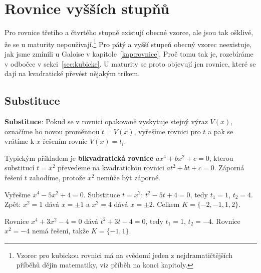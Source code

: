 \section{Rovnice vyšších stupňů}\label{sec:vyssi-stupne}

Pro rovnice třetího a čtvrtého stupně existují obecné vzorce, ale jsou tak ošklivé, že se u maturity nepoužívají.\footnote{Vzorec pro kubickou rovnici má na svědomí jeden z nejdramatičtějších příběhů dějin matematiky, viz příběh na konci kapitoly.} Pro pátý a vyšší stupeň obecný vzorec neexistuje, jak jsme zmínili u Galoise v kapitole~\ref{kap:rovnice}. Proč tomu tak je, rozebíráme v odbočce v sekci~\ref{sec:kubicke}. U maturity se proto objevují jen rovnice, které se dají na kvadratické převést nějakým trikem.

\subsection{Substituce}

\begin{definitionbox}
  \textbf{Substituce}: Pokud se v rovnici opakovaně vyskytuje stejný výraz $V(x)$, označíme ho novou proměnnou $t = V(x)$, vyřešíme rovnici pro $t$ a pak se vrátíme k $x$ řešením rovnic $V(x) = t_i$.

  \vspace{0.2cm}

  Typickým příkladem je \textbf{bikvadratická rovnice} $ax^4 + bx^2 + c = 0$, kterou substitucí $t = x^2$ převedeme na kvadratickou rovnici $at^2 + bt + c = 0$. Záporná řešení $t$ zahodíme, protože $x^2$ nemůže být záporné.
\end{definitionbox}

\begin{example}
  Vyřešme $x^4 - 5x^2 + 4 = 0$. Substituce $t = x^2$: $t^2 - 5t + 4 = 0$, tedy $t_1 = 1$, $t_2 = 4$. Zpět: $x^2 = 1$ dává $x = \pm 1$ a $x^2 = 4$ dává $x = \pm 2$. Celkem $K = \{-2, -1, 1, 2\}$.

  Rovnice $x^4 + 3x^2 - 4 = 0$ dává $t^2 + 3t - 4 = 0$, tedy $t_1 = 1$, $t_2 = -4$. Rovnice $x^2 = -4$ nemá řešení, takže $K = \{-1, 1\}$.
\end{example}

